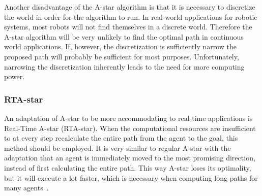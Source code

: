 			Another disadvantage of the A-star algorithm is that it is necessary to discretize the world in order for the algorithm to run. In real-world applications for robotic systems, most robots will not find themselves in a discrete world. Therefore the A-star algorithm will be very unlikely to find the optimal path in continuous world applications. If, however, the discretization is sufficiently narrow the proposed path will probably be sufficient for most purposes. Unfortunately, narrowing the discretization inherently leads to the need for more computing power.\cite{korf1990real, ASta2:online}

			\subsubsection{RTA-star}
				An adaptation of A-star to be more accommodating to real-time applications is Real-Time A-star (RTA-star). When the computational resources are insufficient to at every step recalculate the entire path from the agent to the goal, this method should be employed. It is very similar to regular A-star with the adaptation that an agent is immediately moved to the most promising direction, instead of first calculating the entire path. This way A-star loses its optimality, but it will execute a lot faster, which is necessary when computing long paths for many agents~\cite{korf1990real, rtastar, undeger2010multi, undeger2007single, undeger2009real}.
